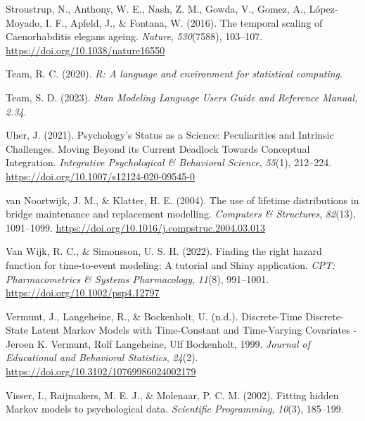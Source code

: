 \documentclass[12pt]{./styles/outhesis}
\begin{document}
\leavevmode{}%
Stroustrup, N., Anthony, W. E., Nash, Z. M., Gowda, V., Gomez, A.,
López-Moyado, I. F., Apfeld, J., \& Fontana, W. (2016). The temporal
scaling of {Caenorhabditis} elegans ageing. \emph{Nature},
\emph{530}(7588), 103--107. \url{https://doi.org/10.1038/nature16550}

\leavevmode{}%
Team, R. C. (2020). \emph{R: {A} language and environment for
statistical computing}.

\leavevmode{}%
Team, S. D. (2023). \emph{Stan {Modeling Language Users Guide} and
{Reference Manual}, 2.34}.

\leavevmode{}%
Uher, J. (2021). Psychology's {Status} as a {Science}: {Peculiarities}
and {Intrinsic Challenges}. {Moving Beyond} its {Current Deadlock
Towards Conceptual Integration}. \emph{Integrative Psychological \&
Behavioral Science}, \emph{55}(1), 212--224.
\url{https://doi.org/10.1007/s12124-020-09545-0}

\leavevmode{}%
van Noortwijk, J. M., \& Klatter, H. E. (2004). The use of lifetime
distributions in bridge maintenance and replacement modelling.
\emph{Computers \& Structures}, \emph{82}(13), 1091--1099.
\url{https://doi.org/10.1016/j.compstruc.2004.03.013}

\leavevmode{}%
Van Wijk, R. C., \& Simonsson, U. S. H. (2022). Finding the right hazard
function for time-to-event modeling: {A} tutorial and {Shiny}
application. \emph{CPT: Pharmacometrics \& Systems Pharmacology},
\emph{11}(8), 991--1001. \url{https://doi.org/10.1002/psp4.12797}

\leavevmode{}%
Vermunt, J., Langeheine, R., \& Bockenholt, U. (n.d.). Discrete-{Time
Discrete-State Latent Markov Models} with {Time-Constant} and
{Time-Varying Covariates} - {Jeroen K}. {Vermunt}, {Rolf Langeheine},
{Ulf Bockenholt}, 1999. \emph{Journal of Educational and Behavioral
Statistics}, \emph{24}(2).
\url{https://doi.org/10.3102/10769986024002179}

\leavevmode{}%
Visser, I., Raijmakers, M. E. J., \& Molenaar, P. C. M. (2002). Fitting
hidden {Markov} models to psychological data. \emph{Scientific
Programming}, \emph{10}(3), 185--199.
\end{document}
